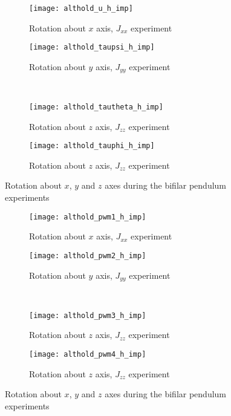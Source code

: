 \begin{appendices}
\begin{figure}[H]
\begin{subfigure}{.5\linewidth}
\centering
\texttt{[image: althold\_u\_h\_imp]}
\caption{Rotation about $x$ axis, $J_{xx}$ experiment}
\label{fig:althold_u_h_imp}
\end{subfigure}%
\begin{subfigure}{.5\linewidth}
\centering
\texttt{[image: althold\_taupsi\_h\_imp]}
\caption{Rotation about $y$ axis, $J_{yy}$ experiment}
\label{fig:althold_taupsi_h_imp}
\end{subfigure}\\[1ex]
\begin{subfigure}{0.5\linewidth}
\centering
\texttt{[image: althold\_tautheta\_h\_imp]}
\caption{Rotation about $z$ axis, $J_{zz}$ experiment}
\label{fig:althold_tautheta_h_imp}
\end{subfigure}
\begin{subfigure}{0.5\linewidth}
\centering
\texttt{[image: althold\_tauphi\_h\_imp]}
\caption{Rotation about $z$ axis, $J_{zz}$ experiment}
\label{fig:althold_tauphi_h_imp}
\end{subfigure}
\caption{Rotation about $x$, $y$ and $z$ axes during the bifilar pendulum experiments}
\label{fig:althold_control_h}
\end{figure}

\begin{figure}[H]
\begin{subfigure}{.5\linewidth}
\centering
\texttt{[image: althold\_pwm1\_h\_imp]}
\caption{Rotation about $x$ axis, $J_{xx}$ experiment}
\label{fig:althold_pwm_h_imp}
\end{subfigure}%
\begin{subfigure}{.5\linewidth}
\centering
\texttt{[image: althold\_pwm2\_h\_imp]}
\caption{Rotation about $y$ axis, $J_{yy}$ experiment}
\label{fig:althold_pwm2_h_imp}
\end{subfigure}\\[1ex]
\begin{subfigure}{0.5\linewidth}
\centering
\texttt{[image: althold\_pwm3\_h\_imp]}
\caption{Rotation about $z$ axis, $J_{zz}$ experiment}
\label{fig:althold_pwm3_h_imp}
\end{subfigure}
\begin{subfigure}{0.5\linewidth}
\centering
\texttt{[image: althold\_pwm4\_h\_imp]}
\caption{Rotation about $z$ axis, $J_{zz}$ experiment}
\label{fig:althold_pwm4_h_imp}
\end{subfigure}
\caption{Rotation about $x$, $y$ and $z$ axes during the bifilar pendulum experiments}
\label{fig:althold_pwm_h}
\end{figure}


\end{appendices}
